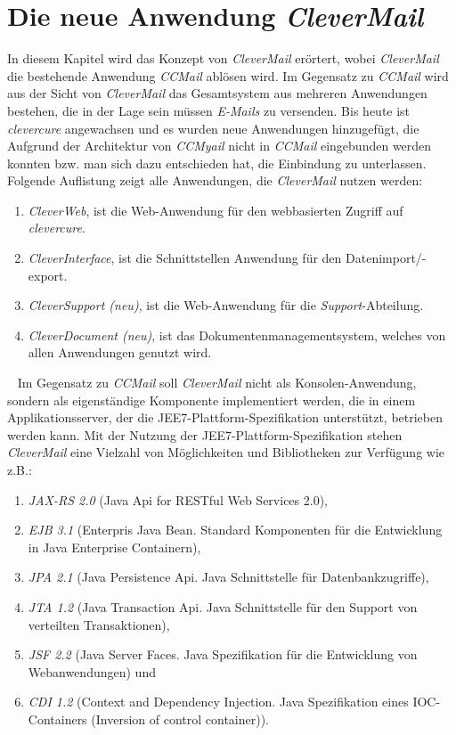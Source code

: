 \chapter{Die neue Anwendung \emph{CleverMail}}
\label{cha:clevermail}
In diesem Kapitel wird das Konzept von \emph{CleverMail} erörtert, wobei \emph{CleverMail} die bestehende Anwendung \emph{CCMail} ablösen wird. Im Gegensatz zu \emph{CCMail} wird aus der Sicht von \emph{CleverMail} das Gesamtsystem aus mehreren Anwendungen bestehen, die in der Lage sein müssen \emph{E-Mails} zu versenden. Bis heute ist \emph{clevercure} angewachsen und es wurden neue Anwendungen hinzugefügt, die Aufgrund der Architektur von \emph{CCMyail} nicht in \emph{CCMail} eingebunden werden konnten bzw. man sich dazu entschieden hat, die Einbindung zu unterlassen.
\newline
\newline
Folgende Auflistung zeigt alle Anwendungen, die \emph{CleverMail} nutzen werden:
\begin{enumerate}
	\item\emph{CleverWeb}, ist die Web-Anwendung für den webbasierten Zugriff auf \emph{clevercure}.
	\item\emph{CleverInterface}, ist die Schnittstellen Anwendung für den Datenimport/-export.
	\item\emph{CleverSupport (neu)}, ist die Web-Anwendung für die \emph{Support}-Abteilung.
	\item\emph{CleverDocument (neu)}, ist das Dokumentenmanagementsystem, welches von allen Anwendungen genutzt wird.
\end{enumerate}
\ \newline
Im Gegensatz zu \emph{CCMail} soll \emph{CleverMail} nicht als Konsolen-Anwendung, sondern als eigenständige Komponente implementiert werden, die in einem Applikationsserver, der die JEE7-Plattform-Spezifikation unterstützt, betrieben werden kann.
\newpage
Mit der Nutzung der JEE7-Plattform-Spezifikation stehen \emph{CleverMail} eine Vielzahl von Möglichkeiten und Bibliotheken zur Verfügung wie z.B.: 
\begin{enumerate}
	\item\emph{JAX-RS 2.0} (Java Api for RESTful Web Services 2.0),
	\item\emph{EJB 3.1} (Enterpris Java Bean. Standard Komponenten für die Entwicklung in Java Enterprise Containern), 
	\item\emph{JPA 2.1} (Java Persistence Api. Java Schnittstelle für Datenbankzugriffe), 
	\item\emph{JTA 1.2} (Java Transaction Api. Java Schnittstelle für den Support von verteilten Transaktionen), 
	\item\emph{JSF 2.2} (Java Server Faces. Java Spezifikation für die Entwicklung von Webanwendungen) und 
	\item\emph{CDI 1.2} (Context and Dependency Injection. Java Spezifikation eines IOC-Containers (Inversion of control container)).
\end{enumerate}
